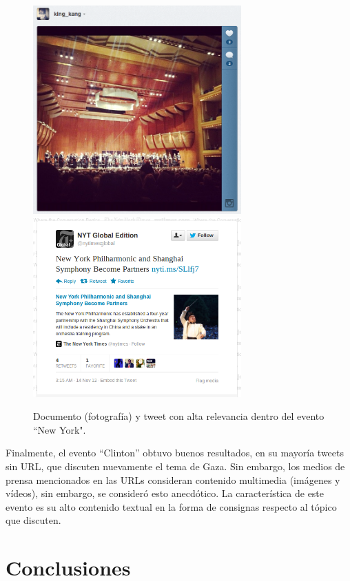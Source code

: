\documentclass[upright, contnum]{umemoria}
\begin{document}
\begin{figure}[h]
  \centering
  \includegraphics[width=8cm]{./img/dvorak.png}
  \includegraphics[width=8cm]{./img/dvorak2.png}  
  \caption[Imagen y documento con altos puntajes entre los resultados obtenidos]
   { Documento (fotografía) y tweet con alta relevancia dentro del evento
  ``New York". \label{fig:dvorak} }
\end{figure}

    Finalmente, el evento ``Clinton'' obtuvo buenos resultados, en su
    mayoría tweets sin URL, que discuten nuevamente el tema de
    Gaza. Sin embargo, los medios de prensa mencionados en las URLs
    consideran contenido multimedia (imágenes y vídeos), sin embargo,
    se consideró esto anecdótico. La característica de este evento es
    su alto contenido textual en la forma de consignas respecto al
    tópico que discuten.

\chapter{Conclusiones}
\label{sec-5}

\label{cap:conclusiones}
\end{document}
